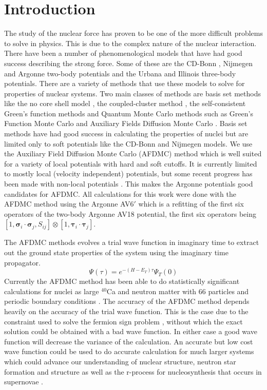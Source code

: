 \documentclass[aps,prl,reprint,superscriptaddress]{revtex4-1}
\newcommand{\ti}{\bm{\tau}_i}
\newcommand{\tj}{\bm{\tau}_j}
\newcommand{\si}{\bm{\sigma}_i}
\newcommand{\sj}{\bm{\sigma}_j}
\begin{document}
\section{Introduction}
The study of the nuclear force has proven to be one of the more difficult problems to solve in physics. This is due to the complex nature of the nuclear interaction. There have been a number of phenomenological models that have had good success describing the strong force. Some of these are the CD-Bonn \cite{machleidt2001}, Nijmegen \cite{nagels1975,stoks1994} and Argonne \cite{wiringa1995} two-body potentials and the Urbana \cite{pudliner1997} and Illinois \cite{pieper2001} three-body potentials. There are a variety of methods that use these models to solve for properties of nuclear systems. Two main classes of methods are basis set methods like the no core shell model \cite{navratil2009,barrett2013}, the coupled-cluster method \cite{hagen2014}, the self-consistent Green's function methods \cite{dickhoff2004,soma2014} and Quantum Monte Carlo methods such as Green's Function Monte Carlo and Auxiliary Fields Diffusion Monte Carlo \cite{carlson2015}. Basis set methods have had good success in calculating the properties of nuclei but are limited only to soft potentials like the CD-Bonn and Nijmegen models. We use the Auxiliary Field Diffusion Monte Carlo (AFDMC) method which is well suited for a variety of local potentials with hard and soft cutoffs. It is currently limited to mostly local (velocity independent) potentials, but some recent progress has been made with non-local potentials \cite{lynn2012,roggero2014a,roggero2014b}. This makes the Argonne potentials good candidates for AFDMC. All calculations for this work were done with the AFDMC method using the Argonne AV6$'$ which is a refitting of the first six operators of the two-body Argonne AV18 potential, the first six operators being $\left[1,\si\cdot\sj,S_{ij}\right]\otimes\left[1,\ti\cdot\tj\right]$.

The AFDMC methods evolves a trial wave function in imaginary time to extract out the ground state properties of the system using the imaginary time propagator. 
\begin{equation}
   \Psi(\tau) = e^{-(H-E_T)\tau}\Psi_T(0)
\end{equation}
Currently the AFDMC method has been able to do statistically significant calculations for nuclei as large $^{40}$Ca and neutron matter with 66 particles and periodic boundary conditions \cite{carlson2015}. The accuracy of the AFDMC method depends heavily on the accuracy of the trial wave function. This is the case due to the constraint used to solve the fermion sign problem \cite{wiringa2000}, without which the exact solution could be obtained with a bad wave function. In either case a good wave function will decrease the variance of the calculation. An accurate but low cost wave function could be used to do accurate calculation for much larger systems which could advance our understanding of nuclear structure, neutron star formation and structure as well as the r-process for nucleosynthesis that occurs in supernovae \cite{lattimer2001,lattimer2004,stone2003,douchin2001,heiselberg2000}.
\end{document}
